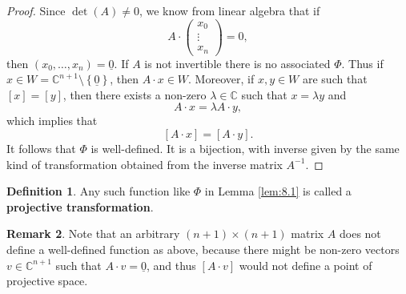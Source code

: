 \documentclass{article}
\newcommand{\C}{\mathbb{C}}
\newcommand{\rb}[1]{\left( #1 \right)}
\renewcommand{\sb}[1]{\left[ #1 \right]}
\newcommand{\cb}[1]{\left\{ #1 \right\}}
\theoremstyle{definition}\newtheorem{definition}{Definition}[section]
\theoremstyle{definition}\newtheorem{notation}[definition]{Notation}
\theoremstyle{definition}\newtheorem{remark}[definition]{Remark}
\theoremstyle{definition}\newtheorem{example1}[definition]{Example}
\theoremstyle{definition}\newtheorem{fact}{Fact}
\theoremstyle{definition}\newtheorem{exercise}{Exercise}
\theoremstyle{definition}\newtheorem*{example2}{Example}
\begin{document}
\begin{proof}
Since $ \det\rb{A} \ne 0 $, we know from linear algebra that if
$$ A \cdot \begin{pmatrix}
x_0 \\
\vdots \\
x_n
\end{pmatrix} = 0, $$
then $ \rb{x_0, \dots, x_n} = \underline{0} $. If $ A $ is not invertible there is no associated $ \Phi $. Thus if $ x \in W = \C^{n + 1} \setminus \cb{\underline{0}} $, then $ A \cdot x \in W $. Moreover, if $ x, y \in W $ are such that $ \sb{x} = \sb{y} $, then there exists a non-zero $ \lambda \in \C $ such that $ x = \lambda y $ and
$$ A \cdot x = \lambda A \cdot y, $$
which implies that
$$ \sb{A \cdot x} = \sb{A \cdot y}. $$
It follows that $ \Phi $ is well-defined. It is a bijection, with inverse given by the same kind of transformation obtained from the inverse matrix $ A^{-1} $.
\end{proof}

\begin{definition}
Any such function like $ \Phi $ in Lemma \ref{lem:8.1} is called a \textbf{projective transformation}.
\end{definition}

\begin{remark}
Note that an arbitrary $ \rb{n + 1} \times \rb{n + 1} $ matrix $ A $ does not define a well-defined function as above, because there might be non-zero vectors $ v \in \C^{n + 1} $ such that $ A \cdot v = \underline{0} $, and thus $ \sb{A \cdot v} $ would not define a point of projective space.
\end{remark}
\end{document}
